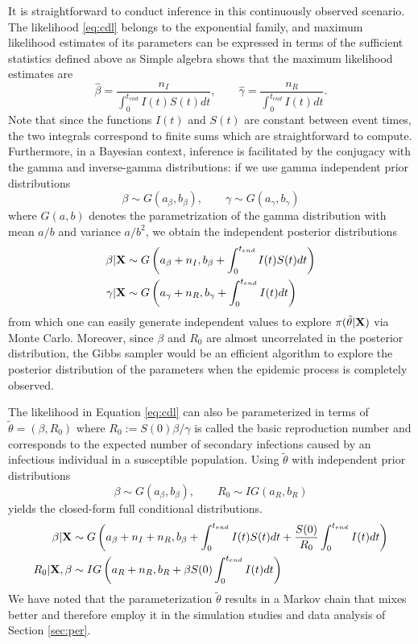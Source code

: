 \documentclass[11pt]{article}
\newcommand{\ram}[1]{{\color{green}{ #1}}}
\begin{document}
	It is straightforward to conduct inference in this continuously observed scenario. The likelihood \eqref{eq:cdl} belongs to the exponential family, and maximum likelihood estimates of its parameters can be expressed in terms of the sufficient statistics defined above as \ram{ref for exponential family and MLE - Guttorp 1994, perhaps newer version with Minin.} Simple algebra shows that the maximum likelihood estimates are
	$$
	\hat{\beta} = \dfrac{n_I}{ \int_{0}^{t_{end}} I(t)S(t)dt}, \qquad \hat{\gamma} = \dfrac{n_R}{ \int_{0}^{t_{end}} I(t)dt}.
	$$
	Note that since the functions $I(t)$ and $S(t)$ are constant between event times, the two integrals correspond to finite sums which are straightforward to compute.
	Furthermore, in a Bayesian context, inference is facilitated by the conjugacy with the gamma and inverse-gamma distributions: if we use gamma independent prior distributions
	\begin{equation}
		\label{eq:pri}
		\beta \sim G(a_{\beta}, b_{\beta}), \qquad \gamma \sim G(a_{\gamma}, b_{\gamma})
	\end{equation}
	where $G(a,b)$ denotes the parametrization of the gamma distribution with mean $a/b$ and variance $a/b^2$, we obtain the independent posterior distributions
	\begin{align}
		\label{eq:posterior_theta}
		\beta | \mathbf{X} & \sim G\left( a_{\beta} + n_I , b_{\beta} + \int_{0}^{t_{end}} I(t)S(t) dt\right) \\
		\gamma | \mathbf{X} & \sim G\left( a_{\gamma} + n_R, b_{\gamma} + \int_{0}^{t_{end}} I(t) dt\right)
	\end{align}
	from which one can easily generate independent values to explore $\pi(\tilde{\theta}|\mathbf{X})$ via Monte Carlo. Moreover, since $\beta$ and $R_0$ are almost uncorrelated in the posterior distribution, the Gibbs sampler would be an efficient algorithm to explore the posterior distribution of the parameters when the epidemic process is completely observed.
	
	The likelihood in Equation \ref{eq:cdl} can also be parameterized in terms of $\tilde{\theta} = (\beta, R_0)$ where $R_0 := S(0) \beta / \gamma$ is called the basic reproduction number and corresponds to the expected number of secondary infections caused by an infectious individual in a susceptible population. Using $\tilde{\theta}$ with independent prior distributions
	\begin{equation}
		\label{eq:pri2}
		\beta \sim G(a_{\beta}, b_{\beta}), \qquad R_0 \sim IG(a_{R}, b_{R})
	\end{equation}
	yields the closed-form full conditional distributions.
	\begin{align}
		\label{eq:posterior_theta2}
		\beta | \mathbf{X} & \sim G\left( a_{\beta} + n_I + n_R, b_{\beta} + \int_{0}^{t_{end}} I(t)S(t) dt + \frac{S(0)}{R_0} \int_{0}^{t_{end}} I(t) dt\right) \\
		R_0 | \mathbf{X}, \beta & \sim IG\left( a_{R} + n_R, b_{R} + \beta S(0) \int_{0}^{t_{end}} I(t) dt\right)
	\end{align}
	We have noted that the parameterization $\tilde{\theta}$ results in a Markov chain that mixes better and therefore employ it in the simulation studies and data analysis of Section \ref{sec:per}.
	
\end{document}

